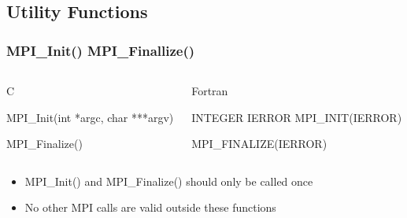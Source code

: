 \documentclass{beamer}
\begin{document}
  \subsection{Utility Functions}
  \begin{frame}[fragile]
  \frametitle{MPI\_Init() MPI\_Finallize()}
   \begin{columns}[T]
    \begin{column}{5cm}
     \begin{block}{C}
      \begin{semiverbatim}
MPI\_Init(int  *argc,
          char ***argv)

MPI\_Finalize()
      \end{semiverbatim}
     \end{block}
    \end{column}
    \begin{column}{5cm}
     \begin{block}{Fortran}
      \begin{semiverbatim}
INTEGER IERROR
MPI\_INIT(IERROR)

MPI\_FINALIZE(IERROR)
      \end{semiverbatim}
     \end{block}
    \end{column}
   \end{columns}
   \begin{itemize}
     \item<2-> MPI\_Init() and MPI\_Finalize() should only be called once
     \item<3-> No other MPI calls are valid outside these functions
   \end{itemize}
\end{frame}
\end{document}
